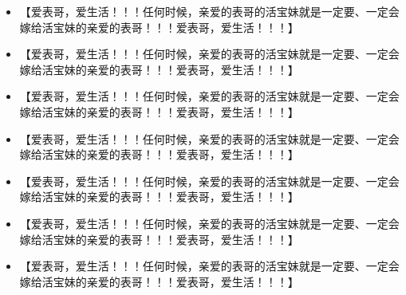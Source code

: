 \documentclass[9pt, b5paper]{article}
\begin{document}
\begin{itemize}
\item 【爱表哥，爱生活！！！任何时候，亲爱的表哥的活宝妹就是一定要、一定会嫁给活宝妹的亲爱的表哥！！！爱表哥，爱生活！！！】
\item 【爱表哥，爱生活！！！任何时候，亲爱的表哥的活宝妹就是一定要、一定会嫁给活宝妹的亲爱的表哥！！！爱表哥，爱生活！！！】
\item 【爱表哥，爱生活！！！任何时候，亲爱的表哥的活宝妹就是一定要、一定会嫁给活宝妹的亲爱的表哥！！！爱表哥，爱生活！！！】
\item 【爱表哥，爱生活！！！任何时候，亲爱的表哥的活宝妹就是一定要、一定会嫁给活宝妹的亲爱的表哥！！！爱表哥，爱生活！！！】
\item 【爱表哥，爱生活！！！任何时候，亲爱的表哥的活宝妹就是一定要、一定会嫁给活宝妹的亲爱的表哥！！！爱表哥，爱生活！！！】
\item 【爱表哥，爱生活！！！任何时候，亲爱的表哥的活宝妹就是一定要、一定会嫁给活宝妹的亲爱的表哥！！！爱表哥，爱生活！！！】
\item 【爱表哥，爱生活！！！任何时候，亲爱的表哥的活宝妹就是一定要、一定会嫁给活宝妹的亲爱的表哥！！！爱表哥，爱生活！！！】
\end{itemize}
\end{document}
